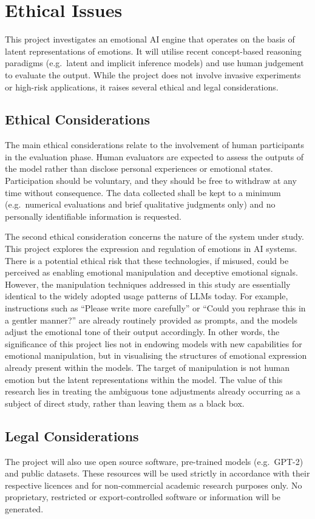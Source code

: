 \chapter{Ethical Issues}

This project investigates an emotional AI engine that operates on the basis of latent representations of emotions. It will utilise recent concept-based reasoning paradigms (e.g.\ latent and implicit inference models) and use human judgement to evaluate the output. While the project does not involve invasive experiments or high-risk applications, it raises several ethical and legal considerations.

\section{Ethical Considerations}
The main ethical considerations relate to the involvement of human participants in the evaluation phase. Human evaluators are expected to assess the outputs of the model rather than disclose personal experiences or emotional states. Participation should be voluntary, and they should be free to withdraw at any time without consequence. The data collected shall be kept to a minimum (e.g.\ numerical evaluations and brief qualitative judgments only) and no personally identifiable information is requested.

The second ethical consideration concerns the nature of the system under study. This project explores the expression and regulation of emotions in AI systems. There is a potential ethical risk that these technologies, if misused, could be perceived as enabling emotional manipulation and deceptive emotional signals. However, the manipulation techniques addressed in this study are essentially identical to the widely adopted usage patterns of LLMs today. For example, instructions such as ``Please write more carefully'' or ``Could you rephrase this in a gentler manner?'' are already routinely provided as prompts, and the models adjust the emotional tone of their output accordingly. In other words, the significance of this project lies not in endowing models with new capabilities for emotional manipulation, but in visualising the structures of emotional expression already present within the models. The target of manipulation is not human emotion but the latent representations within the model. The value of this research lies in treating the ambiguous tone adjustments already occurring as a subject of direct study, rather than leaving them as a black box.

\section{Legal Considerations}

The project will also use open source software, pre-trained models (e.g.\ GPT-2) and public datasets. These resources will be used strictly in accordance with their respective licences and for non-commercial academic research purposes only. No proprietary, restricted or export-controlled software or information will be generated.